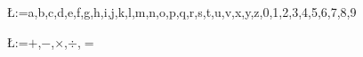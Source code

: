 \documentclass[a4paper]{article}
\begin{document}
\pagestyle{empty}

\makeatletter
\@for\L:={a,b,c,d,e,f,g,h,i,j,k,l,m,n,o,p,q,r,s,t,u,v,x,y,z,0,1,2,3,4,5,6,7,8,9}\do{ %
  ~

  \vfill

  \centering\noindent\resizebox{60\width}{!}{\scshape\L}

  \vfill
  ~

  \pagebreak}

\@for\L:={$+$,$-$,$\times$,$\div$,$=$}\do{
  ~

  \vfill

  \centering\noindent\resizebox{2\width}{!}{\fontsize{250}{260}\selectfont\L}

  \vfill
  ~

  \pagebreak}


\makeatother
\end{document}
